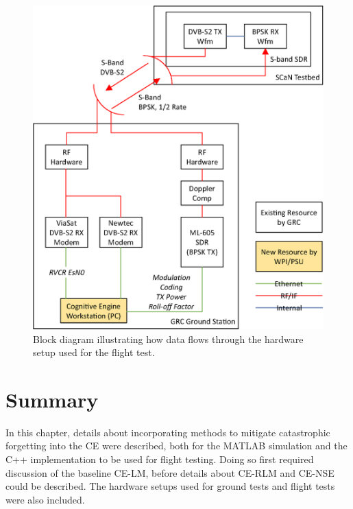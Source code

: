 \begin{figure}[ht]
\includegraphics{figures/system_block_diagram.eps}
\caption{Block diagram illustrating how data flows through the hardware setup used for the flight test.}\label{methods:flightTestFig}
\end{figure} 

\section{Summary}
\par In this chapter, details about incorporating methods to mitigate catastrophic forgetting into the CE were described, both for the MATLAB simulation and the C++ implementation to be used for flight testing. Doing so first required discussion of the baseline CE-LM, before details about CE-RLM and CE-NSE could be described. The hardware setups used for ground tests and flight tests were also included.